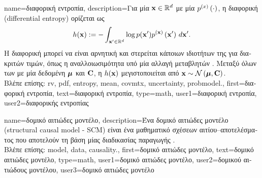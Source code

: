 {name={\foreignlanguage{greek}{διαφορική εντροπία}},
	description={\foreignlanguage{greek}{Για μία}  
		\foreignlanguage{greek}{${\bf x} \in \mathbb{R}^{d}$ με μία}
		 $p^{(x)}\left(\cdot\right)$, \foreignlanguage{greek}{η διαφορική}  
		(differential entropy) \foreignlanguage{greek}{ορίζεται ως} \cite{coverthomas}
		\[
			h({\bf x}) := - \int_{{\bf x}' \in \mathbb{R}^{d}} 
			\log p({\bf x}') p^{({\bf x})}\left({\bf x}'\right) \, d {\bf x}'.
		\]
		\foreignlanguage{greek}{Η διαφορική}  \foreignlanguage{greek}{μπορεί να είναι αρνητική 
		και στερείται κάποιων ιδιοτήτων της}  \foreignlanguage{greek}{για}  
		\foreignlanguage{greek}{διακριτών τιμών, όπως η αναλλοιωσιμότητα υπό μία αλλαγή μεταβλητών} \cite{coverthomas}. 
		\foreignlanguage{greek}{Μεταξύ όλων των}  \foreignlanguage{greek}{με μία δεδομένη} 
		 ${\bm \mu}$ \foreignlanguage{greek}{και}  ${\bf C}$, 
		\foreignlanguage{greek}{η $h({\bf x})$ μεγιστοποιείται από} ${\bf x} \sim \mathcal{N}\left({\bm \mu},{\bf C}\right)$. 
		\\
		\foreignlanguage{greek}{Βλέπε επίσης:} \gls{rv}, \gls{pdf}, \gls{entropy}, \gls{mean}, \gls{covmtx}, \gls{uncertainty}, \gls{probmodel}.},
	first={\foreignlanguage{greek}{διαφορική εντροπία}},
	text={\foreignlanguage{greek}{διαφορική εντροπία}},
	type=math,
	user1={\foreignlanguage{greek}{διαφορική εντροπία}}, %
  	user2={\foreignlanguage{greek}{διαφορικής εντροπίας}} %
}

{name={\foreignlanguage{greek}{δομικό αιτιώδες μοντέλο}}, 
	description={\foreignlanguage{greek}{Ένα δομικό αιτιώδες μοντέλο} 
		(structural causal model - SCM) \foreignlanguage{greek}{είναι ένα μαθηματικό}  \foreignlanguage{greek}{σχέσεων 
		αιτίου–αποτελέσματος που αποτελούν τη βάση μίας διαδικασίας παραγωγής}  \cite{Pearl:2010aa}. 
		\\
		\foreignlanguage{greek}{Βλέπε επίσης:} \gls{model}, \gls{data}, \gls{causality}.},
	first={\foreignlanguage{greek}{δομικό αιτιώδες μοντέλο}},
	text={\foreignlanguage{greek}{δομικό αιτιώδες μοντέλο}},
	type=math,
	user1={\foreignlanguage{greek}{δομικό αιτιώδες μοντέλο}}, %
	user2={\foreignlanguage{greek}{δομικού αιτιώδους μοντέλου}}, %
	user3={\foreignlanguage{greek}{δομικό αιτιώδες μοντέλο}} %
}%

